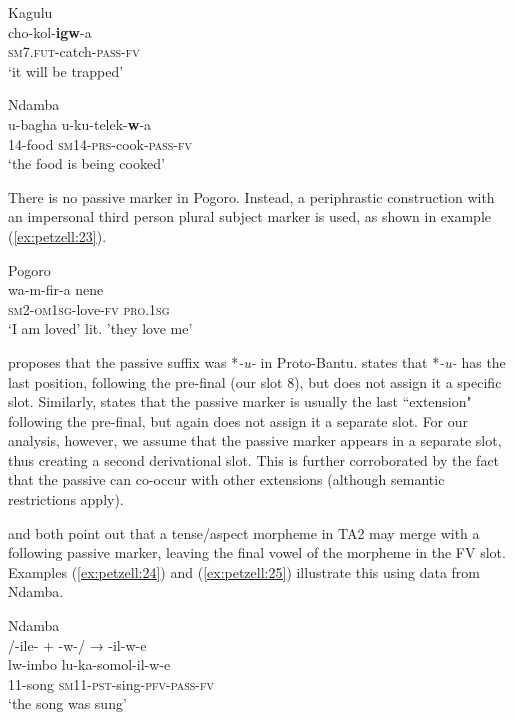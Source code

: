 \documentclass[output=paper,
            colorlinks, citecolor=brown
            ,draftmode
		  ]{langscibook}
\begin{document}
\ea\label{ex:petzell:21}Kagulu\\
\gll cho-kol-\textbf{igw}{}-a   \\
\textsc{sm}7.\textsc{fut}{}-catch-\textsc{{pass}}{}-\textsc{fv}\\
\glt `it will be trapped'


\ex\label{ex:petzell:22}Ndamba\\
\gll u-bagha u-ku-telek-\textbf{w}{}-a  \\
14-food \textsc{sm}14-\textsc{prs}{}-cook-\textsc{{pass}}{}-\textsc{fv}\\
\glt `the food is being cooked'
\z


There is no passive marker in Pogoro. Instead, a periphrastic construction with an impersonal third person plural subject marker is used, as shown in example (\ref{ex:petzell:23}).


\ea\label{ex:petzell:23}Pogoro\\
\gll wa-m-fir-a         nene\\
\textsc{sm2}{}-\textsc{om}1\textsc{sg}{}-love-\textsc{fv}   \textsc{pro}.1\textsc{sg}\\
\glt `I am loved' lit. 'they love me'
\z


\citet{Stappers1967} proposes that the passive suffix was *\textit{{}-u-} in Proto-Bantu. \citet[92]{Meeussen1967} states that *\textit{{}-u-} has the last position, following the pre-final (our slot 8), but does not assign it a specific slot. Similarly, \citet[37]{Nurse2008} states that the passive marker is usually the last “extension" following the pre-final, but again does not assign it a separate slot. For our analysis, however, we assume that the passive marker appears in a separate slot, thus creating a second derivational slot. This is further corroborated by the fact that the passive can co-occur with other extensions (although semantic restrictions apply).



\citet[37]{Nurse2008} and \citet[92]{Meeussen1967} both point out that a tense/aspect morpheme in TA2 may merge with a following passive marker, leaving the final vowel of the morpheme in the FV slot. Examples (\ref{ex:petzell:24}) and (\ref{ex:petzell:25}) illustrate this using data from Ndamba.


\ea\label{ex:petzell:24}Ndamba\\
 {{/}}{}-ile- + -w-{{/}} → {}-il-w-e  \\
\gll lw-imbo    lu-ka-somol-il-w-e\\
11-song    \textsc{sm}11-\textsc{pst}{}-sing-\textsc{pfv}{}-\textsc{pass}{}-\textsc{fv}\\
\glt `the song was sung'
\end{document}
